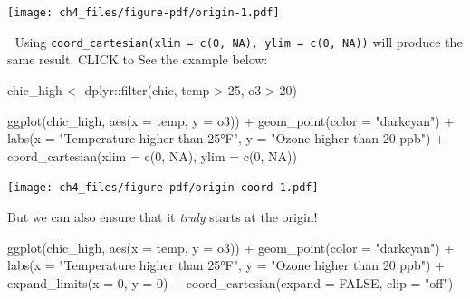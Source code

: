 \documentclass[
  letterpaper,
  DIV=11,
  numbers=noendperiod]{scrreprt}
\newenvironment{Shaded}{\begin{snugshade}}{\end{snugshade}}
\newcommand{\AttributeTok}[1]{\textcolor[rgb]{0.40,0.45,0.13}{#1}}
\newcommand{\ConstantTok}[1]{\textcolor[rgb]{0.56,0.35,0.01}{#1}}
\newcommand{\DecValTok}[1]{\textcolor[rgb]{0.68,0.00,0.00}{#1}}
\newcommand{\FunctionTok}[1]{\textcolor[rgb]{0.28,0.35,0.67}{#1}}
\newcommand{\NormalTok}[1]{\textcolor[rgb]{0.00,0.23,0.31}{#1}}
\newcommand{\OtherTok}[1]{\textcolor[rgb]{0.00,0.23,0.31}{#1}}
\newcommand{\SpecialCharTok}[1]{\textcolor[rgb]{0.37,0.37,0.37}{#1}}
\newcommand{\StringTok}[1]{\textcolor[rgb]{0.13,0.47,0.30}{#1}}
\begin{document}
\texttt{[image: ch4\_files/figure-pdf/origin-1.pdf]}

💁 Using
\texttt{coord\_cartesian(xlim\ =\ c(0,\ NA),\ ylim\ =\ c(0,\ NA))} will
produce the same result. CLICK to See the example below:

\begin{Shaded}
\begin{Highlighting}[]
\NormalTok{chic\_high }\OtherTok{\textless{}{-}}\NormalTok{ dplyr}\SpecialCharTok{::}\FunctionTok{filter}\NormalTok{(chic, temp }\SpecialCharTok{\textgreater{}} \DecValTok{25}\NormalTok{, o3 }\SpecialCharTok{\textgreater{}} \DecValTok{20}\NormalTok{)}

\FunctionTok{ggplot}\NormalTok{(chic\_high, }\FunctionTok{aes}\NormalTok{(}\AttributeTok{x =}\NormalTok{ temp, }\AttributeTok{y =}\NormalTok{ o3)) }\SpecialCharTok{+}
  \FunctionTok{geom\_point}\NormalTok{(}\AttributeTok{color =} \StringTok{"darkcyan"}\NormalTok{) }\SpecialCharTok{+}
  \FunctionTok{labs}\NormalTok{(}\AttributeTok{x =} \StringTok{"Temperature higher than 25°F"}\NormalTok{,}
       \AttributeTok{y =} \StringTok{"Ozone higher than 20 ppb"}\NormalTok{) }\SpecialCharTok{+}
  \FunctionTok{coord\_cartesian}\NormalTok{(}\AttributeTok{xlim =} \FunctionTok{c}\NormalTok{(}\DecValTok{0}\NormalTok{, }\ConstantTok{NA}\NormalTok{), }\AttributeTok{ylim =} \FunctionTok{c}\NormalTok{(}\DecValTok{0}\NormalTok{, }\ConstantTok{NA}\NormalTok{))}
\end{Highlighting}
\end{Shaded}

\texttt{[image: ch4\_files/figure-pdf/origin-coord-1.pdf]}

But we can also ensure that it \emph{truly} starts at the origin!

\begin{Shaded}
\begin{Highlighting}[]
\FunctionTok{ggplot}\NormalTok{(chic\_high, }\FunctionTok{aes}\NormalTok{(}\AttributeTok{x =}\NormalTok{ temp, }\AttributeTok{y =}\NormalTok{ o3)) }\SpecialCharTok{+}
  \FunctionTok{geom\_point}\NormalTok{(}\AttributeTok{color =} \StringTok{"darkcyan"}\NormalTok{) }\SpecialCharTok{+}
  \FunctionTok{labs}\NormalTok{(}\AttributeTok{x =} \StringTok{"Temperature higher than 25°F"}\NormalTok{,}
       \AttributeTok{y =} \StringTok{"Ozone higher than 20 ppb"}\NormalTok{) }\SpecialCharTok{+}
  \FunctionTok{expand\_limits}\NormalTok{(}\AttributeTok{x =} \DecValTok{0}\NormalTok{, }\AttributeTok{y =} \DecValTok{0}\NormalTok{) }\SpecialCharTok{+}
  \FunctionTok{coord\_cartesian}\NormalTok{(}\AttributeTok{expand =} \ConstantTok{FALSE}\NormalTok{, }\AttributeTok{clip =} \StringTok{"off"}\NormalTok{)}
\end{Highlighting}
\end{Shaded}
\end{document}
